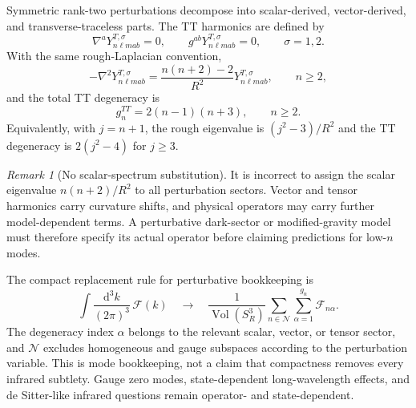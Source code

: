 \documentclass[
  aps,
  prd,
  reprint,
  superscriptaddress,
  nofootinbib,
  floatfix,
  longbibliography
]{revtex4-2}
\theoremstyle{plain}
\theoremstyle{definition}
\theoremstyle{remark}
\newtheorem{remark}[theorem]{Remark}
\newcommand{\dd}{\mathrm d}
\newcommand{\Vol}{\operatorname{Vol}}
\begin{document}
Symmetric rank-two perturbations decompose into scalar-derived, vector-derived,
and transverse-traceless parts.  The TT harmonics are defined by
\begin{equation}
\nabla^aY^{T,\sigma}_{n\ell m ab}=0,\qquad
g^{ab}Y^{T,\sigma}_{n\ell m ab}=0,\qquad \sigma=1,2.
\label{eq:tt_conditions}
\end{equation}
With the same rough-Laplacian convention,
\begin{equation}
-\nabla^2Y^{T,\sigma}_{n\ell m ab}
=\frac{n(n+2)-2}{R^2}Y^{T,\sigma}_{n\ell m ab},\qquad n\geq2,
\label{eq:tt_rough_eigen}
\end{equation}
and the total TT degeneracy is
\begin{equation}
g_n^{TT}=2(n-1)(n+3),\qquad n\geq2.
\label{eq:tt_degeneracy}
\end{equation}
Equivalently, with $j=n+1$, the rough eigenvalue is $(j^2-3)/R^2$ and the TT
degeneracy is $2(j^2-4)$ for $j\geq3$.

\begin{remark}[No scalar-spectrum substitution]
It is incorrect to assign the scalar eigenvalue $n(n+2)/R^2$ to all
perturbation sectors.  Vector and tensor harmonics carry curvature shifts, and
physical operators may carry further model-dependent terms.  A perturbative
dark-sector or modified-gravity model must therefore specify its actual
operator before claiming predictions for low-$n$ modes.
\end{remark}

The compact replacement rule for perturbative bookkeeping is
\begin{equation}
\int \frac{\dd^3 k}{(2\pi)^3}\,\mathcal F(k)
\quad\longrightarrow\quad
\frac{1}{\Vol(S^3_R)}
\sum_{n\in\mathcal N}\sum_{\alpha=1}^{g_n}\mathcal F_{n\alpha}.
\label{eq:compact_replacement_rule}
\end{equation}
The degeneracy index $\alpha$ belongs to the relevant scalar, vector, or tensor
sector, and $\mathcal N$ excludes homogeneous and gauge subspaces according to
the perturbation variable.  This is mode bookkeeping, not a claim that
compactness removes every infrared subtlety.  Gauge zero modes, state-dependent
long-wavelength effects, and de Sitter-like infrared questions remain
operator- and state-dependent.
\end{document}
